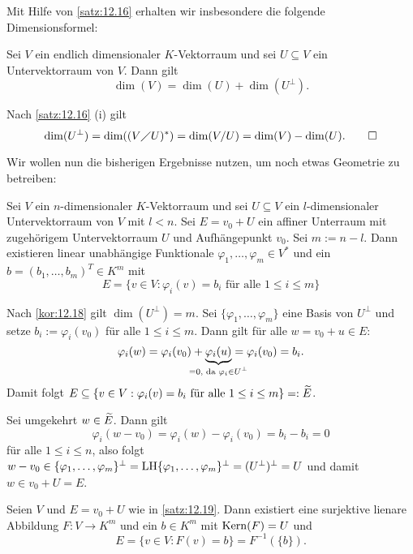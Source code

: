 Mit Hilfe von \autoref{satz:12.16} erhalten wir insbesondere die folgende Dimensionsformel:

\begin{korollar}
	\label{kor:12.18}
	Sei $V$ ein endlich dimensionaler $K$-Vektorraum und sei $U \subseteq V$ ein Untervektorraum von $V$.
	Dann gilt
	\[
		\dim(V) = \dim(U) + \dim(U^\perp).
	\]
\end{korollar}

\begin{beweis}
	Nach \autoref{satz:12.16} (i) gilt
	\[
		\dim(U^\perp) = \dim((V\diagup U)^*) = \dim(V/U) = \dim(V) - \dim(U). \qedhere
	\]
\end{beweis}

Wir wollen nun die bisherigen Ergebnisse nutzen, um noch etwas Geometrie zu betreiben:

\begin{satz}
	\label{satz:12.19}
	Sei $V$ ein $n$-dimensionaler $K$-Vektorraum und sei $U \subseteq V$ ein $l$-dimensionaler Untervektorraum von $V$ mit $l < n$.
	Sei $E = v_0 + U$ ein affiner Unterraum mit zugehörigem Untervektorraum $U$ und Aufhängepunkt $v_0$.
	Sei $m := n -l$.
	Dann existieren linear unabhängige Funktionale $\varphi_1, \dots, \varphi_m \in V^*$ und ein $b = (b_1,\dots,b_m)^T \in K^m$ mit
	\[
		E = \{v \in V : \varphi_i(v) = b_i \text{ für alle } 1 \leq i \leq m\}
	\]
\end{satz}
\newpage
\begin{beweis}
	Nach \autoref{kor:12.18} gilt $\dim(U^\perp) = m$.
	Sei $\{\varphi_1,\dots,\varphi_m\}$ eine Basis von $U^\perp$ und setze $b_i := \varphi_i(v_0)$ für alle $1 \leq i \leq m$.
	Dann gilt für alle $w = v_0 + u \in E$:
	\[
		\varphi_i(w) = \varphi_i(v_0) + \Underbrace{\varphi_i(u)}{\mathclap{=0\text{, da } \varphi_i \in U^\perp}} = \varphi_i(v_0) = b_i.
	\]
	Damit folgt $E \subseteq \{v \in V : \varphi_i(v) = b_i \text{ für alle }1 \leq i \leq m\} =: \widetilde{E}$.
	
	Sei umgekehrt $w \in \widetilde{E}$.
	Dann gilt
	\[
		\varphi_i(w - v_0) = \varphi_i(w) - \varphi_i(v_0) = b_i - b_i = 0
	\]
	für alle $1 \leq i \leq n$, also folgt $w - v_0 \in \{\varphi_1,\dots,\varphi_m\}^\perp = \operatorname{LH}\{\varphi_1,\dots,\varphi_m\}^\perp = (U^\perp)^\perp = U$ und damit $w \in v_0 + U = E$. \qedhere
\end{beweis}

\begin{korollar}
	\label{kor:12.20}
	Seien $V$ und $E = v_0 + U$ wie in \autoref{satz:12.19}.
	Dann existiert eine surjektive lienare Abbildung $F \colon V \rightarrow K^m$ und ein $b \in K^m$ mit $\operatorname{Kern}(F) = U$ und
	\[
		E = \{v \in V : F(v) = b\} = F^{-1}(\{b\}).
	\]
\end{korollar}

